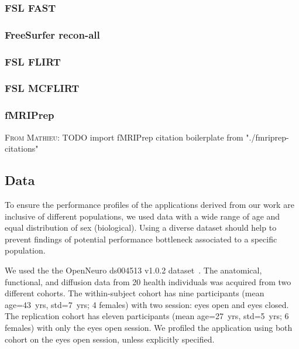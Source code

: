 \documentclass[conference]{IEEEtran}
\newcommand{\MD}[1]{\color{magenta}\textsc{From Mathieu: }#1\color{black}}
\begin{document}
\subsubsection{FSL FAST}


\subsubsection{FreeSurfer recon-all}


\subsubsection{FSL FLIRT}

\subsubsection{FSL MCFLIRT}

\subsubsection{fMRIPrep}
\MD{TODO import fMRIPrep citation boilerplate from "./fmriprep-citations"}

\subsection{Data}
To ensure the performance profiles of the applications derived from our work are inclusive of different populations, we used data with a wide range of age and equal distribution of sex (biological). Using a diverse dataset should help to prevent findings of potential performance bottleneck associated to a specific population.

We used the the OpenNeuro ds004513 v1.0.2 dataset~\cite{ds004513:1.0.2}. The anatomical, functional, and diffusion data from 20 health individuals was acquired from two different cohorts. The within-subject cohort has nine participants (mean age=43~yrs, std=7~yrs; 4 females) with two session: eyes open and eyes closed. The replication cohort has eleven participants (mean age=27~yrs, std=5~yrs; 6 females) with only the eyes open session. We profiled the application using both cohort on the eyes open session, unless explicitly specified.
\end{document}
